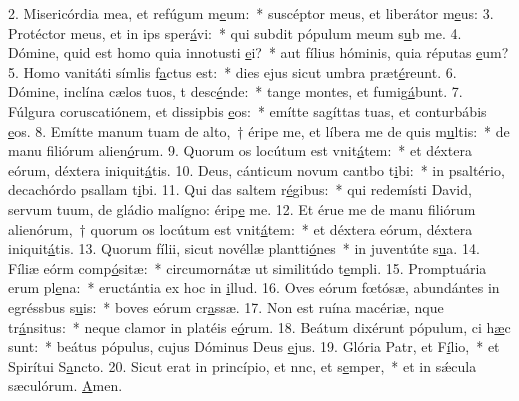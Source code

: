 2. Misericórdia mea, et refúgum m\uline{e}um:~* suscéptor meus, et liberátor m\uline{e}us:
3. Protéctor meus, et in ips sper\uline{á}vi:~* qui subdit pópulum meum s\uline{u}b me.
4. Dómine, quid est homo quia innotusti \uline{e}i?~* aut fílius hóminis, quia réputas \uline{e}um?
5. Homo vanitáti símlis f\uline{a}ctus est:~* dies ejus sicut umbra præt\uline{é}reunt.
6. Dómine, inclína cælos tuos, t desc\uline{é}nde:~* tange montes, et fumig\uline{á}bunt.
7. Fúlgura coruscatiónem, et dissipbis \uline{e}os:~* emítte sagíttas tuas, et conturbábis \uline{e}os.
8. Emítte manum tuam de alto,~† éripe me, et líbera me de quis m\uline{u}ltis:~* de manu filiórum alien\uline{ó}rum.
9. Quorum os locútum est vnit\uline{á}tem:~* et déxtera eórum, déxtera iniquit\uline{á}tis.
10. Deus, cánticum novum cantbo t\uline{i}bi:~* in psaltério, decachórdo psallam t\uline{i}bi.
11. Qui das saltem r\uline{é}gibus:~* qui redemísti David, servum tuum, de gládio malígno: érip\uline{e} me.
12. Et érue me de manu filiórum alienórum,~† quorum os locútum est vnit\uline{á}tem:~* et déxtera eórum, déxtera iniquit\uline{á}tis.
13. Quorum fílii, sicut novéllæ plantti\uline{ó}nes~* in juventúte s\uline{u}a.
14. Fíliæ eórm comp\uline{ó}sitæ:~* circumornátæ ut similitúdo t\uline{e}mpli.
15. Promptuária erum pl\uline{e}na:~* eructántia ex hoc in \uline{i}llud.
16. Oves eórum fœtósæ, abundántes in egréssbus s\uline{u}is:~* boves eórum cr\uline{a}ssæ.
17. Non est ruína macériæ, nque tr\uline{á}nsitus:~* neque clamor in platéis e\uline{ó}rum.
18. Beátum dixérunt pópulum, ci h\uline{æ}c sunt:~* beátus pópulus, cujus Dóminus Deus \uline{e}jus.
19. Glória Patr, et F\uline{í}lio,~* et Spirítui S\uline{a}ncto.
20. Sicut erat in princípio, et nnc, et s\uline{e}mper,~* et in sǽcula sæculórum. \uline{A}men.
